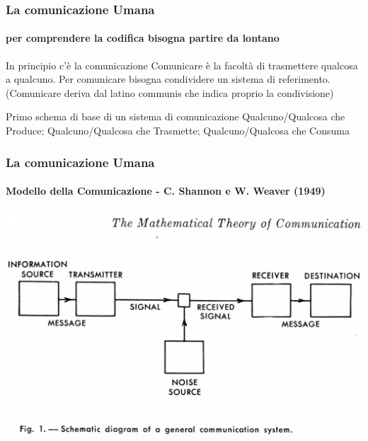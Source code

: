 \begin{frame}
	\frametitle{La comunicazione Umana}
	\framesubtitle{per comprendere la codifica bisogna partire da lontano}
	\addtocounter{nframe}{1}

	\begin{block}{In principio c'è la comunicazione}
		Comunicare è la facoltà di trasmettere qualcosa a qualcuno. Per comunicare bisogna condividere un sistema di referimento.
		\\(Comunicare deriva dal latino communis che indica proprio la condivisione)
	\end{block}

	\begin{block}{Primo schema di base di un sistema di comunicazione}
		Qualcuno/Qualcosa che Produce; Qualcuno/Qualcosa che Trasmette; Qualcuno/Qualcosa che Consuma
	\end{block}

\end{frame}

\begin{frame}
	\frametitle{La comunicazione Umana}
	\framesubtitle{Modello della Comunicazione - C. Shannon e W. Weaver (1949)}
	\addtocounter{nframe}{1}

	\begin{center}
		\includegraphics[width=.9\textwidth]{imgs/shannon_comm_channel.jpg}
	\end{center}

\end{frame}

